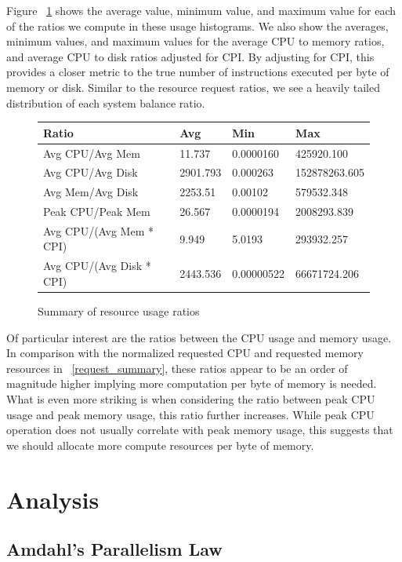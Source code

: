\documentclass{sig-alternate}
\begin{document}
Figure ~\ref{actual_summary} shows the average value, minimum value, and maximum value for each of the ratios we compute in these usage histograms.
We also show the averages, minimum values, and maximum values for the average CPU to memory ratios, and average CPU to disk ratios adjusted for CPI.
By adjusting for CPI, this provides a closer metric to the true number of instructions executed per byte of memory or disk.
Similar to the resource request ratios, we see a heavily tailed distribution of each system balance ratio.

\begin{figure}[t]
\centering
\begin{tabular}{| p{2.5cm} | p{1.5cm} | p{1.5cm} | p{1.5cm} |} \hline
Ratio & Avg & Min & Max \\ \hline
Avg CPU/Avg Mem & 11.737 & 0.0000160 & 425920.100  \\ \hline
Avg CPU/Avg Disk & 2901.793 & 0.000263 & 152878263.605 \\ \hline
Avg Mem/Avg Disk & 2253.51 & 0.00102 & 579532.348 \\ \hline
Peak CPU/Peak Mem & 26.567 & 0.0000194 & 2008293.839 \\ \hline
Avg CPU/(Avg Mem * CPI) & 9.949 & 5.0193 & 293932.257 \\ \hline
Avg CPU/(Avg Disk * CPI) & 2443.536 & 0.00000522 & 66671724.206 \\ \hline
\end{tabular}
\label{actual_summary}
\caption{Summary of resource usage ratios}
\end{figure}

Of particular interest are the ratios between the CPU usage and memory usage.
In comparison with the normalized requested CPU and requested memory resources in ~\ref{request_summary}, these ratios appear to be an order of magnitude higher implying more computation per byte of memory is needed.
What is even more striking is when considering the ratio between peak CPU usage and peak memory usage, this ratio further increases.
While peak CPU operation does not usually correlate with peak memory usage, this suggests that we should allocate more compute resources per byte of memory.

\section{Analysis}

\subsection{Amdahl's Parallelism Law}
\end{document}
